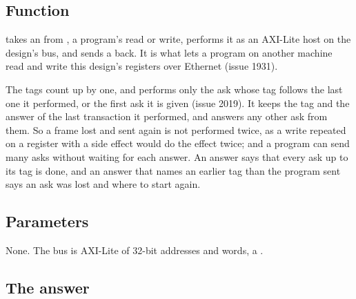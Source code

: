 
%
{}

\subsection*{Function}

 takes an  from , a program's
read or write, performs it as an AXI-Lite host on the design's bus, and
sends a  back. It is what lets a program on another
machine read and write this design's registers over Ethernet (issue
1931).

The tags count up by one, and  performs only the ask
whose tag follows the last one it performed, or the first ask it is
given (issue 2019). It keeps the tag and the answer of the last
transaction it performed, and answers any other ask from them. So a
frame lost and sent again is not performed twice, as a write repeated
on a register with a side effect would do the effect twice; and a
program can send many asks without waiting for each answer. An answer
says that every ask up to its tag is done, and an answer that names an
earlier tag than the program sent says an ask was lost and where to
start again.

\subsection*{Parameters}

None. The bus is AXI-Lite of 32-bit addresses and words, a
.

\subsection*{The answer}

